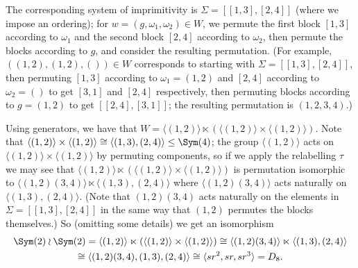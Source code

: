 {\begin{example}
        The corresponding system of imprimitivity is $\Sigma = [[1,3],[2,4]]$ (where we impose an ordering); for $w = (g,\omega_1,\omega_2) \in W$, we permute the first block $[1,3]$ according to $\omega_1$ and the second block $[2,4]$ according to $\omega_2$, then permute the blocks according to $g$, and consider the resulting permutation. (For example, $((1,2),(1,2),()) \in W$ corresponds to starting with $\Sigma = [[1,3],[2,4]]$, then permuting $[1,3]$ according to $\omega_1 = (1,2)$ and $[2,4]$ according to $\omega_2 = ()$ to get $[3,1]$ and $[2,4]$ respectively, then permuting blocks according to $g = (1,2)$ to get $[[2,4],[3,1]]$; the resulting permutation is $(1,2,3,4)$.)

        Using generators, we have that $W = \langle(1,2)\rangle \ltimes (\langle(1,2)\rangle \times \langle(1,2)\rangle)$. Note that $\langle(1,2)\rangle \times \langle(1,2)\rangle \cong \langle(1,3),(2,4)\rangle \leq \Sym(4)$; the group $\langle(1,2)\rangle$ acts on $\langle(1,2)\rangle \times \langle(1,2)\rangle$ by permuting components, so if we apply the relabelling $\tau$ we may see that $\langle(1,2)\rangle \ltimes (\langle(1,2)\rangle \times \langle(1,2)\rangle)$ is permutation isomorphic to $\langle(1,2)(3,4)\rangle \ltimes \langle(1,3),(2,4)\rangle$ where $\langle(1,2)(3,4)\rangle$ acts naturally on $\langle(1,3),(2,4)\rangle$. (Note that $(1,2)(3,4)$ acts naturally on the elements in $\Sigma = [[1,3],[2,4]]$ in the same way that $(1,2)$ permutes the blocks themselves.) So (omitting some details) we get an isomorphism
        \begin{multline*}
            \Sym(2) \wr \Sym(2) = \langle(1,2)\rangle \ltimes (\langle(1,2)\rangle \times \langle(1,2)\rangle) \cong \langle(1,2)(3,4)\rangle \ltimes \langle(1,3),(2,4)\rangle \\
            \cong \langle(1,2)(3,4),(1,3),(2,4)\rangle \cong \langle sr^2,sr,sr^3 \rangle = D_8.
        \end{multline*}
    \end{example}}

